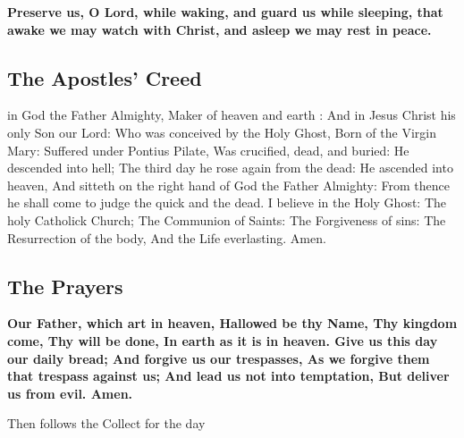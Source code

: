 \textbf{Preserve us, O Lord, while waking,
and guard us while sleeping,
that awake we may watch with Christ,
and asleep we may rest in peace.}

\subsection{The Apostles' Creed}

 in God the Father Almighty, Maker of heaven and earth :
And in Jesus Christ his only Son our Lord: Who was conceived by the Holy Ghost, Born of the Virgin Mary: Suffered under Pontius Pilate, Was crucified, dead, and buried: He descended into hell; The third day he rose again from the dead: He ascended into heaven, And sitteth on the right hand of God the Father Almighty: From thence he shall come to judge the quick and the dead.
I believe in the Holy Ghost: The holy Catholick Church; The Communion of Saints: The Forgiveness of sins: The Resurrection of the body, And the Life everlasting. Amen.

\subsection{The Prayers}


\textbf{Our Father, which art in heaven,
Hallowed be thy Name,
Thy kingdom come,
Thy will be done,
In earth as it is in heaven.
Give us this day our daily bread;
And forgive us our trespasses,
As we forgive them that trespass against us;
And lead us not into temptation,
But deliver us from evil.
Amen.}




\begin{rubric}
Then follows the Collect for the day
\end{rubric}

